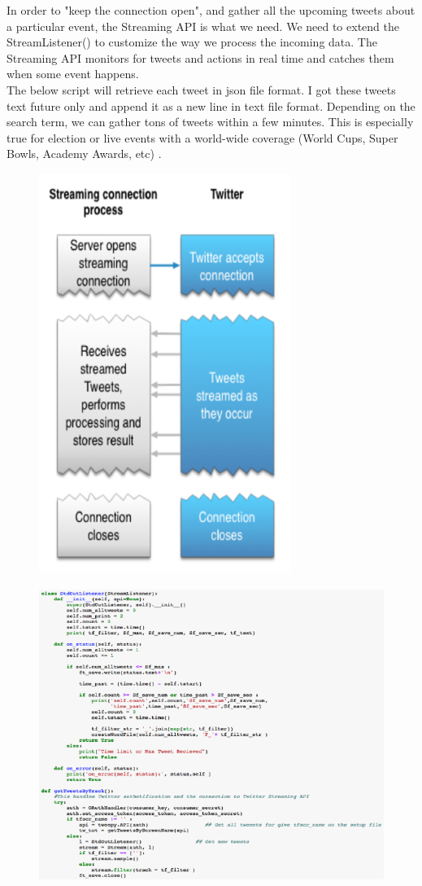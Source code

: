 \documentclass[12pt,notitlepage]{article}
\begin{document}
In order to "keep the connection open", and gather all the upcoming tweets about a particular event, the Streaming API is what we need. We need to extend the StreamListener() to customize the way we process the incoming data. The  Streaming API monitors for tweets and actions in real time and catches them when some event happens. \\

The below script will retrieve each tweet in json file format. I got these tweets text future only and append it as a new line in text file format. Depending on the search term, we can gather tons of tweets within a few minutes. This is especially true for election or live events with a world-wide coverage (World Cups, Super Bowls, Academy Awards, etc) \cite{Bonzanini:2015}.

\begin{figure}[htb]
	\centering
	\includegraphics[width=0.2\linewidth]{Streaming_1.pdf}
	\caption{}
	\label{fig:Streaming_1}
\end{figure}


\newpage

\begin{figure}[htb]
	\includegraphics[width=1.2\linewidth]{Streaming_2.pdf}
	\caption{}
	\label{fig:Streaming_2}
\end{figure}
\end{document}
